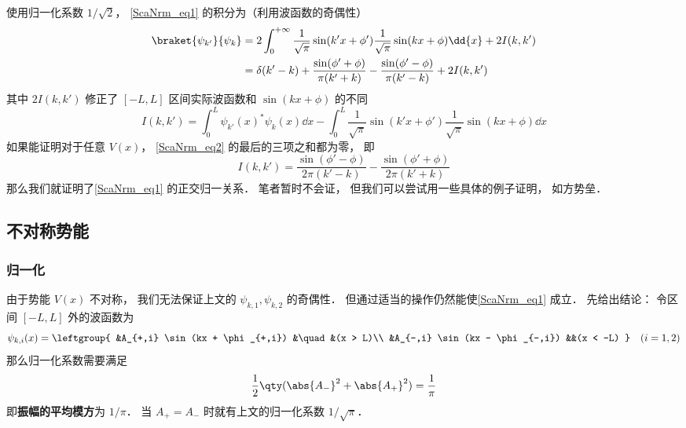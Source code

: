 使用归一化系数 $1/\sqrt{2}$， \autoref{ScaNrm_eq1} 的积分为（利用波函数的奇偶性）
\begin{equation}\label{ScaNrm_eq2}
\begin{aligned}
\braket{\psi_{k'}}{\psi_k} &= 2\int_{0}^{+\infty} \frac{1}{\sqrt{\pi}}\sin(k'x+\phi')\frac{1}{\sqrt{\pi}}\sin(kx+\phi) \dd{x} + 2I(k,k')\\
&= \delta(k'-k) + \frac{\sin(\phi'+\phi)}{\pi(k'+k)} - \frac{\sin(\phi'-\phi)}{\pi(k'-k)} + 2I(k,k')
\end{aligned}
\end{equation}
其中 $2I(k,k')$ 修正了 $[-L,L]$ 区间实际波函数和 $\sin(kx+\phi)$ 的不同
\begin{equation}
I(k,k') = \int_0^L \psi_{k'}(x)^* \psi_k(x) \dd{x}
-\int_{0}^{L} \frac{1}{\sqrt{\pi}}\sin(k'x+\phi') \frac{1}{\sqrt{\pi}}\sin(kx+\phi) \dd{x}
\end{equation}
如果能证明对于任意 $V(x)$， \autoref{ScaNrm_eq2} 的最后的三项之和都为零， 即
\begin{equation}
I(k,k') = \frac{\sin(\phi'-\phi)}{2\pi(k'-k)} - \frac{\sin(\phi'+\phi)}{2\pi(k'+k)}
\end{equation}
那么我们就证明了\autoref{ScaNrm_eq1} 的正交归一关系． 笔者暂时不会证， 但我们可以尝试用一些具体的例子证明， 如方势垒．

\subsection{不对称势能}
\subsubsection{归一化}
由于势能 $V(x)$ 不对称， 我们无法保证上文的 $\psi_{k,1},\psi_{k,2}$ 的奇偶性． 但通过适当的操作仍然能使\autoref{ScaNrm_eq1} 成立． 先给出结论： 令区间 $[-L,L]$ 外的波函数为
\begin{equation}\label{ScaNrm_eq9}
\psi_{k,i}(x) = \leftgroup{
    &A_{+,i} \sin(kx + \phi_{+,i}) &\quad &(x > L)\\
    &A_{-,i} \sin(kx - \phi_{-,i}) &&(x < -L)
} \quad (i = 1,2)
\end{equation}
那么归一化系数需要满足
\begin{equation}\label{ScaNrm_eq4}
\frac{1}{2}\qty(\abs{A_-}^2 + \abs{A_+}^2) = \frac{1}{\pi}
\end{equation}
即\textbf{振幅的平均模方}为 $1/\pi$． 当 $A_+ = A_-$ 时就有上文的归一化系数 $1/\sqrt{\pi}$．

